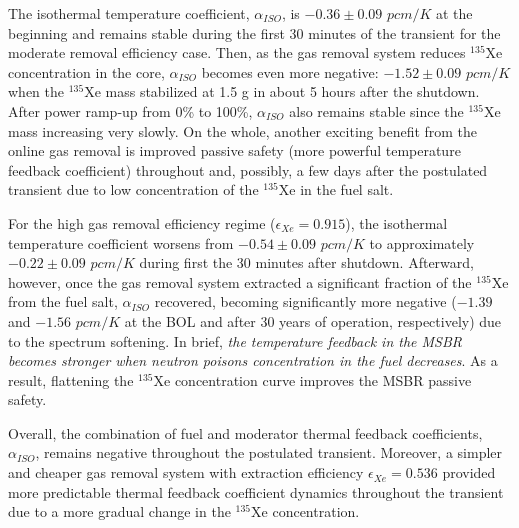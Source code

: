 The isothermal temperature coefficient, $\alpha_{ISO}$, is $-0.36\pm0.09$ 
$pcm/K$ at the beginning and remains stable during the first 30 minutes of the 
transient for the moderate removal efficiency case.  Then, as the gas removal 
system reduces $^{135}$Xe concentration in the core, $\alpha_{ISO}$ becomes 
even more negative: $-1.52\pm0.09$ $pcm/K$ when the $^{135}$Xe mass stabilized 
at 1.5 g in about 5 hours after the shutdown. After power ramp-up from 0\% to 
100\%, $\alpha_{ISO}$ also remains stable since the $^{135}$Xe mass increasing 
very slowly. On the whole, another exciting benefit from the online gas 
removal is improved passive safety (more powerful temperature feedback 
coefficient) throughout and, possibly, a few days after the postulated 
transient due to low concentration of the $^{135}$Xe in the fuel salt.

For the high gas removal efficiency regime ($\epsilon_{Xe}=0.915$), the 
isothermal temperature coefficient worsens from $-0.54\pm0.09$ $pcm/K$ to 
approximately $-0.22\pm0.09$ $pcm/K$ during first the 30 minutes after 
shutdown. 
Afterward, however, once the gas removal system extracted a significant 
fraction of the $^{135}$Xe from the fuel salt, $\alpha_{ISO}$ recovered, 
becoming significantly more 
negative ($-1.39$ and $-1.56$ $pcm/K$ at the \gls{BOL} and after 30 years of 
operation, respectively) due to the spectrum softening. In brief, \emph{the 
temperature feedback in the \gls{MSBR} becomes stronger when neutron poisons 
concentration in the fuel decreases}. As a result, flattening the $^{135}$Xe 
concentration curve improves the \gls{MSBR} passive safety.

Overall, the combination of fuel and moderator thermal feedback coefficients, 
$\alpha_{ISO}$, remains negative throughout the postulated transient. 
Moreover, a simpler and cheaper gas removal system with extraction 
efficiency $\epsilon_{Xe}=0.536$ provided more predictable thermal feedback 
coefficient dynamics throughout the transient due to 
a more gradual change in the $^{135}$Xe concentration.

